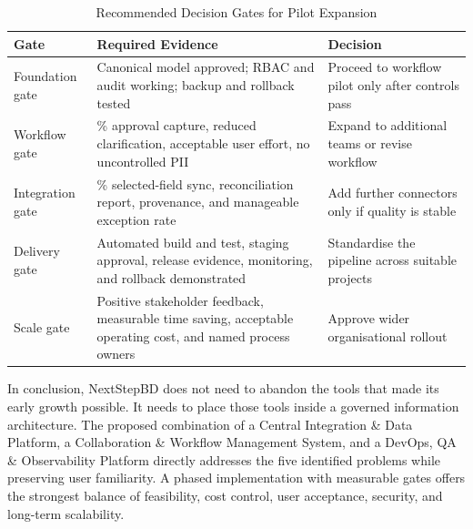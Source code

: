 \documentclass[12pt,a4paper]{report}
\begin{document}
\begin{table}[H]
\centering
\caption{Recommended Decision Gates for Pilot Expansion}
\label{tab:decision-gates}
\small
\renewcommand{\arraystretch}{1.25}
\begin{tabularx}{\textwidth}{>{\raggedright\arraybackslash}p{2.2cm}
                                >{\raggedright\arraybackslash}X
                                >{\raggedright\arraybackslash}p{4.2cm}}
\toprule
\textbf{Gate} & \textbf{Required Evidence} & \textbf{Decision} \\
\midrule
Foundation gate & Canonical model approved; RBAC and audit working; backup and rollback tested & Proceed to workflow pilot only after controls pass \\
Workflow gate & 95\% approval capture, reduced clarification, acceptable user effort, no uncontrolled PII & Expand to additional teams or revise workflow \\
Integration gate & 95\% selected-field sync, reconciliation report, provenance, and manageable exception rate & Add further connectors only if quality is stable \\
Delivery gate & Automated build and test, staging approval, release evidence, monitoring, and rollback demonstrated & Standardise the pipeline across suitable projects \\
Scale gate & Positive stakeholder feedback, measurable time saving, acceptable operating cost, and named process owners & Approve wider organisational rollout \\
\bottomrule
\end{tabularx}
\end{table}

In conclusion, NextStepBD does not need to abandon the tools that made its early growth possible.
It needs to place those tools inside a governed information architecture. The proposed combination
of a Central Integration \& Data Platform, a Collaboration \& Workflow Management System,
and a DevOps, QA \& Observability Platform directly addresses the five identified problems while
preserving user familiarity. A phased implementation with measurable gates offers the strongest
balance of feasibility, cost control, user acceptance, security, and long-term scalability.



\end{document}
